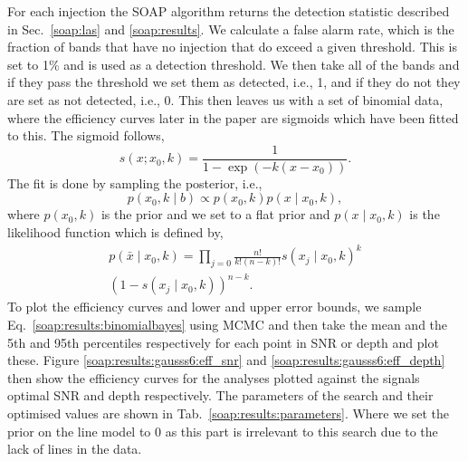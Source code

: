 %
%
For each injection the SOAP algorithm returns the detection statistic described in Sec.~\ref{soap:las} and \ref{soap:results}.
We calculate a false alarm rate, which is the fraction of bands that have no injection that do exceed a given threshold. This is set to 1\% and is used as a detection threshold.
We then take all of the bands and if they pass the threshold we set them as detected, i.e., 1, and if they do not they are set as not detected, i.e., 0.
This then leaves us with a set of binomial data, where the efficiency curves later in the paper are sigmoids which have been fitted to this.
The sigmoid follows,
\begin{equation}
s(x; x_0, k)  = \frac{1}{1-\exp{(-k(x - x_0))}}.
\end{equation}
The fit is done by sampling the posterior, i.e.,
\begin{equation}
\label{soap:results:binomialbayes}
p(x_0, k \mid b) \propto  p(x_0,k)p(x \mid x_0, k),
\end{equation}
where $p(x_0,k)$ is the prior and we set to a flat prior and $p(x \mid x_0, k)$ is the likelihood function which is defined by,
\begin{equation}
\begin{split}
p(\bar{x} \mid x_0, k) = \prod_{j=0}\frac{n!}{k!(n-k)!}s(x_j \mid x_0, k)^{k} \\ (1-s(x_j \mid x_0,k))^{n-k}.
\end{split}
\end{equation}
To plot the efficiency curves and lower and upper error bounds, we sample Eq.~\ref{soap:results:binomialbayes} using \gls{MCMC} and then take the mean and the 5th and 95th percentiles respectively for each point in SNR or depth and plot these.
Figure \ref{soap:results:gausss6:eff_snr} and \ref{soap:results:gausss6:eff_depth} then show the efficiency curves for the analyses plotted against the signals optimal \gls{SNR} and depth respectively.
The parameters of the search and their optimised values are shown in Tab.~\ref{soap:results:parameters}. Where we set the prior on the line model to 0 as this part is irrelevant to this search due to the lack of lines in the data.

